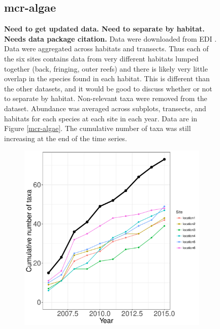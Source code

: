 \documentclass[11pt, oneside]{article}
\begin{document}
\begin{figure}[h!]
\subsection {mcr-algae}
{\bf Need to get updated data. Need to separate by habitat. Needs data package citation.}
Data were downloaded from EDI \citep{mcr-algae}.
Data were aggregated across habitats and transects.
Thus each of the six sites contains data from very different habitats lumped together (back, fringing, outer reefs) and there is likely very little overlap in the species found in each habitat. 
This is different than the other datasets, and it would be good to discuss whether or not to separate by habitat.
Non-relevant taxa were removed from the dataset.
Abundance was averaged across subplots, transects, and habitats for each species at each site in each year.
Data are in Figure \ref{mcr-algae}.
The cumulative number of taxa was still increasing at the end of the time series.
\begin{figure}[h!]
\centering
\includegraphics[scale = 0.4]{mcr-algae-castorani_species_accumulation_curve.pdf}

\end{figure}
\end{figure}
\end{document}
